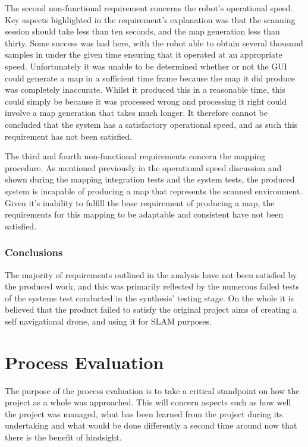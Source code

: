 		The second non-functional requirement concerns the robot's operational speed. Key aspects highlighted in the requirement's explanation was that the scanning session should take less than ten seconds, and the map generation less than thirty. Some success was had here, with the robot able to obtain several thousand samples in under the given time ensuring that it operated at an appropriate speed. Unfortunately it was unable to be determined whether or not the GUI could generate a map in a sufficient time frame because the map it did produce was completely inaccurate. Whilst it produced this in a reasonable time, this could simply be because it was processed wrong and processing it right could involve a map generation that takes much longer. It therefore cannot be concluded that the system has a satisfactory operational speed, and as such this requirement has not been satisfied.
		
		The third and fourth non-functional requirements concern the mapping procedure. As mentioned previously in the operational speed discussion and shown during the mapping integration tests and the system tests, the produced system is incapable of producing a map that represents the scanned environment. Given it's inability to fulfill the base requirement of producing a map, the requirements for this mapping to be adaptable and consistent have not been satisfied.	
	
		\subsection{Conclusions}
		The majority of requirements outlined in the analysis have not been satisfied by the produced work, and this was primarily reflected by the numerous failed tests of the systems test conducted in the synthesis' testing stage. On the whole it is believed that the product failed to satisfy the original project aims of creating a self navigational drone, and using it for SLAM purposes. 
	
	\chapter{Process Evaluation}
	\label{evaluation:processevaluation}
	The purpose of the process evaluation is to take a critical standpoint on how the project as a whole was approached. This will concern aspects such as how well the project was managed, what has been learned from the project during its undertaking and what would be done differently a second time around now that there is the benefit of hindsight.
	
